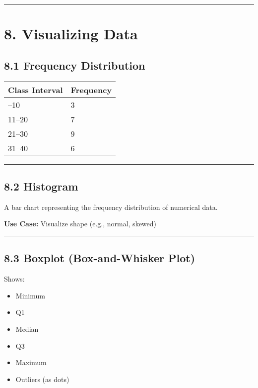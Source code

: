 \documentclass[
  letterpaper,
  DIV=11,
  numbers=noendperiod]{scrreprt}
\providecommand{\tightlist}{%
  \setlength{\itemsep}{0pt}\setlength{\parskip}{0pt}}
\begin{document}
\begin{center}\rule{0.5\linewidth}{0.5pt}\end{center}

\section{8. Visualizing Data}\label{visualizing-data}

\subsection{8.1 Frequency Distribution}\label{frequency-distribution}

\begin{longtable}[]{@{}ll@{}}
\toprule\noalign{}
Class Interval & Frequency \\
\midrule\noalign{}
\endhead
\bottomrule\noalign{}
\endlastfoot
0--10 & 3 \\
11--20 & 7 \\
21--30 & 9 \\
31--40 & 6 \\
\end{longtable}

\begin{center}\rule{0.5\linewidth}{0.5pt}\end{center}

\subsection{8.2 Histogram}\label{histogram}

A bar chart representing the frequency distribution of numerical data.

\textbf{Use Case:} Visualize shape (e.g., normal, skewed)

\begin{center}\rule{0.5\linewidth}{0.5pt}\end{center}

\subsection{8.3 Boxplot (Box-and-Whisker
Plot)}\label{boxplot-box-and-whisker-plot}

Shows:

\begin{itemize}
\tightlist
\item
  Minimum
\item
  Q1
\item
  Median
\item
  Q3
\item
  Maximum
\item
  Outliers (as dots)
\end{itemize}
\end{document}
